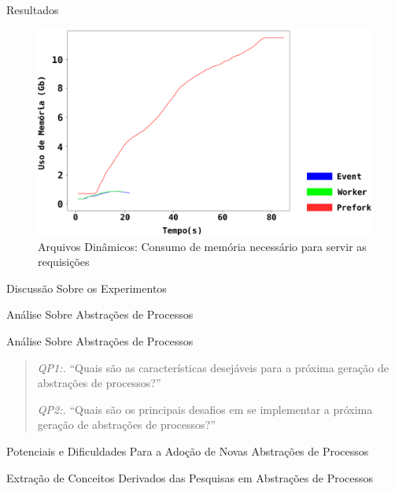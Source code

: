\documentclass[xcolor={usenames,svgnames,dvipsnames},brazil,english,12pt,aspectratio=149]{beamer}
\begin{document}
\begin{frame}{Resultados}
  \begin{figure}[!h]
    \centering
    \includegraphics[width=.60\textwidth]{dynamic_file_memory_usage}

    \caption{Arquivos Dinâmicos: Consumo de memória necessário para servir as requisições}
    \label{fig:dynamic_file_memory}
  \end{figure}
\end{frame}

\begin{frame}{Discussão Sobre os Experimentos}
\end{frame}

\begin{frame}{Análise Sobre Abstrações de Processos}
\end{frame}

\begin{frame}{Análise Sobre Abstrações de Processos}
  \begin{quote}
   \item \textit{QP1:.} ``Quais são as características desejáveis para a próxima geração de abstrações de processos?''
   \item \textit{QP2:.} ``Quais são os principais desafios em se implementar a próxima geração de abstrações de processos?''
  \end{quote}
\end{frame}

\begin{frame}{Potenciais e Dificuldades Para a Adoção de Novas Abstrações de Processos}
  
\end{frame}

\begin{frame}{Extração de Conceitos Derivados das Pesquisas em Abstrações de Processos}
\end{frame}
\end{document}

